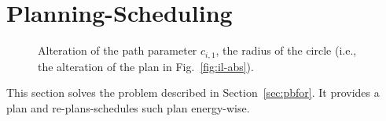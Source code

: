 \documentclass[letterpaper,10pt,journal,twoside]{IEEEtran}
\newcommand{\figpath}{./figures}
\theoremstyle{definition}
\begin{document}




\vspace*{-1.4ex}
\section{Planning-Scheduling}  %
\label{sec:algo}               %
\begin{figure}[t]
  \footnotesize
  \begin{minipage}[l]{0.21\columnwidth}
    \caption{Alteration of the path parameter $c_{i,1}$, the radius of the circle (i.e., the alteration of the plan in Fig.~\ref{fig:il-abs}).
    }
    \label{fig:tee1}
  \end{minipage}\hfill
  \begin{minipage}[c]{0.77\columnwidth}
    \centering
    \vspace*{-4.5ex}
    
  \end{minipage}
  \vspace*{-4.5ex}
\end{figure}

This section solves the problem described in Section~\ref{sec:pbfor}. It provides a plan %
and re-plans-schedules such plan energy-wise. %
\end{document}
